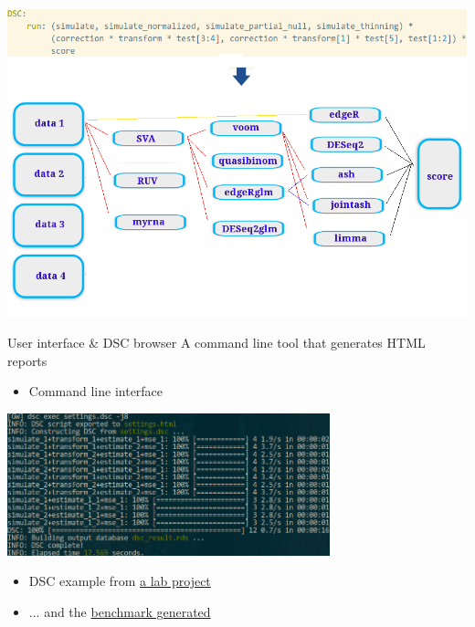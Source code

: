 \begin{withoutheadline}
\begin{frame}[fragile]
  \centering \includegraphics[width=\textwidth]{figs/3}
\end{frame}
\end{withoutheadline}
\begin{frame}{User interface \& DSC browser}
  A command line tool that generates HTML reports
\begin{itemize}
  \item Command line interface
\end{itemize}
  \centering \includegraphics[width=0.7\textwidth]{figs/4}
\begin{itemize}
  \item DSC example from \href{http://www.bioinformatics.org/labnotes/dr-tree/dsc/20160630/benchmark.html}{a lab project}
  \item ... and the
    \href{http://www.bioinformatics.org/labnotes/dr-tree/figures/20160630/simulation-brownian-20160630.html}{benchmark generated}
\end{itemize}
\end{frame}
